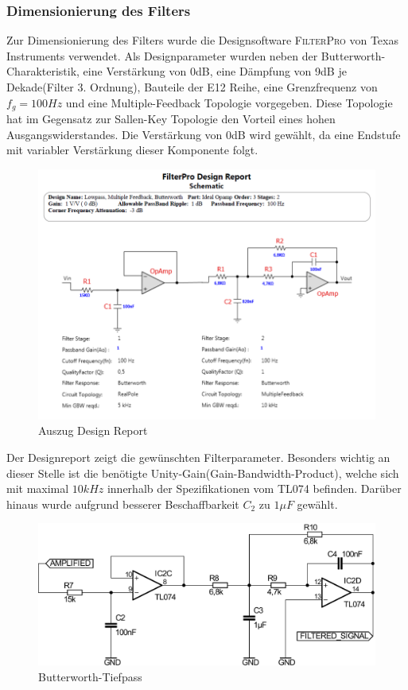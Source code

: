 \subsubsection{Dimensionierung des Filters}
Zur Dimensionierung des Filters wurde die Designsoftware \textsc{FilterPro} von Texas Instruments verwendet. Als Designparameter wurden neben der Butter\-worth-Charakteristik, eine Verstärkung von 0dB, eine Dämpfung von 9dB je Dekade(Filter 3. Ordnung), Bauteile der E12 Reihe, eine Grenzfrequenz von $f_g=100Hz$ und eine Multiple-Feedback Topologie vorgegeben. Diese Topologie hat im Gegensatz zur Sallen-Key Topologie den Vorteil eines hohen Ausgangswiderstandes. Die Verstärkung von 0dB wird gewählt, da eine Endstufe mit variabler Verstärkung dieser Komponente folgt.
\begin{figure}[H]
	\centering
	\includegraphics[scale=0.575]{gfx/Butterworth_FilterPro.png}
	\caption{Auszug Design Report}
	\label{fig:design_report}
\end{figure}
\noindent
Der Designreport zeigt die gewünschten Filterparameter. Besonders wichtig an dieser Stelle ist die benötigte Unity-Gain(Gain-Bandwidth-Product), welche sich mit maximal $10kHz$ innerhalb der Spezifikationen vom \textsc{TL074} befinden. Darüber hinaus wurde aufgrund besserer Beschaffbarkeit $C_2$ zu $1\mu F$ gewählt.
\begin{figure}[H]
	\centering
	\includegraphics[scale=0.5]{gfx/filter.pdf}
	\caption{Butterworth-Tiefpass}
\end{figure}
